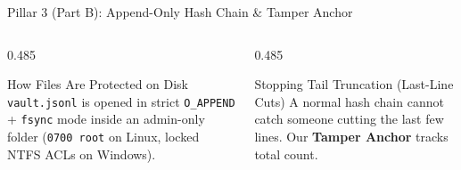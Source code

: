 \documentclass[aspectratio=169,10pt]{beamer}
\begin{document}
\begin{frame}{Pillar 3 (Part B): Append-Only Hash Chain \& Tamper Anchor}
  \vspace{0.2cm}
  \begin{columns}[T]
    \begin{column}{0.485\textwidth}
      \begin{softcard}[snCardBorder]{How Files Are Protected on Disk}
        \scriptsize
        \texttt{vault.jsonl} is opened in strict \texttt{O\_APPEND} + \texttt{fsync} mode inside an admin-only folder (\texttt{0700 root} on Linux, locked NTFS ACLs on Windows).
      \end{softcard}
    \end{column}
    \begin{column}{0.485\textwidth}
      \begin{softcard}[snBlue!45]{Stopping Tail Truncation (Last-Line Cuts)}
        \scriptsize
        A normal hash chain cannot catch someone cutting the last few lines. Our \textbf{Tamper Anchor} tracks total count.
      \end{softcard}
    \end{column}
  \end{columns}
\end{frame}
\end{document}
